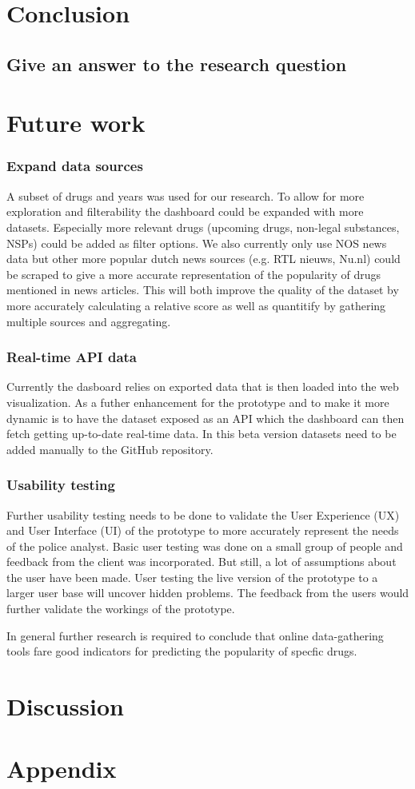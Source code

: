 \section{Conclusion}
\subsection{Give an answer to the research question}

\section{Future work}

\subsubsection{Expand data sources}
A subset of drugs and years was used for our research. To allow for more exploration and filterability the dashboard could be expanded with more datasets. Especially more relevant drugs (upcoming drugs, non-legal substances, NSPs) could be added as filter options. We also currently only use NOS news data but other more popular dutch news sources (e.g. RTL nieuws, Nu.nl) could be scraped to give a more accurate representation of the popularity of drugs mentioned in news articles. This will both improve the quality of the dataset by more accurately calculating a relative score as well as quantitify by gathering multiple sources and aggregating.

\subsubsection{Real-time API data}
Currently the dasboard relies on exported data that is then loaded into the web visualization. As a futher enhancement for the prototype and to make it more dynamic is to have the dataset exposed as an API which the dashboard can then fetch getting up-to-date real-time data. In this beta version datasets need to be added manually to the GitHub repository.

\subsubsection{Usability testing}
Further usability testing needs to be done to validate the User Experience (UX) and User Interface (UI) of the prototype to more accurately represent the needs of the police analyst. Basic user testing was done on a small group of people and feedback from the client was incorporated. But still, a lot of assumptions about the user have been made. User testing the live version of the prototype to a larger user base will uncover hidden problems. The feedback from the users would further validate the workings of the prototype.

In general further research is required to conclude that online data-gathering tools fare good indicators for predicting the popularity of specfic drugs.

\section{Discussion}

\section{Appendix}
